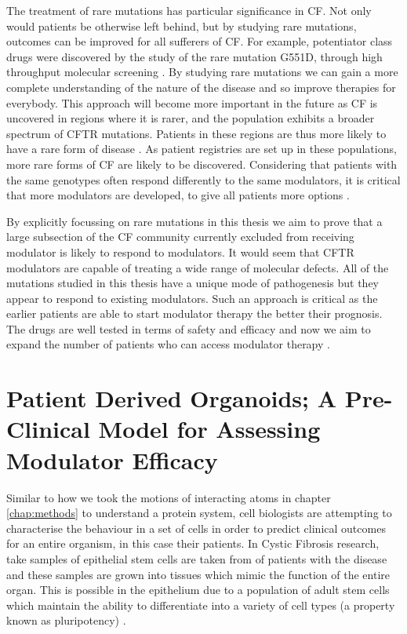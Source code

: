 The treatment of rare mutations has particular significance in CF. Not only would patients be otherwise left behind, but by studying rare mutations, outcomes can be improved for all sufferers of CF. For example, potentiator class drugs were discovered by the study of the rare mutation G551D, through high throughput molecular screening \cite{vangoor2009}. By studying rare mutations we can gain a more complete understanding of the nature of the disease and so improve therapies for everybody. This approach will become more important in the future as CF is uncovered in regions where it is rarer, and the population exhibits a broader spectrum of CFTR mutations. Patients in these regions are thus more likely to have a rare form of disease \cite{singh2015,zheng2017,ni2022}. As patient registries are set up in these populations, more rare forms of CF are likely to be discovered\cite{zheng2017}. Considering that patients with the same genotypes often respond differently to the same modulators, it is critical that more modulators are developed, to give all patients more options \cite{}.


By explicitly focussing on rare mutations in this thesis we aim to prove that a large subsection of the CF community currently excluded from receiving modulator is likely to respond to modulators. It would seem that CFTR modulators are capable of treating a wide range of molecular defects. All of the mutations studied in this thesis have a unique mode of pathogenesis but they appear to respond to existing modulators. Such an approach is critical as the earlier patients are able to start modulator therapy the better their prognosis. The drugs are well tested in terms of safety and efficacy and now we aim to expand the number of patients who can access modulator therapy \cite{}.

\section{Patient Derived Organoids; A Pre-Clinical Model for Assessing Modulator Efficacy}
Similar to how we took the motions of interacting atoms in chapter \ref{chap:methods} to understand a protein system, cell biologists are attempting to characterise the behaviour in a set of cells in order to predict clinical outcomes for an entire organism, in this case their patients. In Cystic Fibrosis research, take samples of epithelial stem cells are taken from of patients with the disease and these samples are grown into tissues which mimic the function of the entire organ\cite{wong2015,depoel2020}. This is possible in the epithelium due to a population of adult stem cells which maintain the ability to differentiate into a variety of cell types (a property known as pluripotency) \cite{}. 

